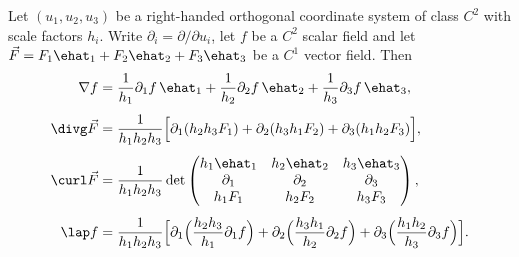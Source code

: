\begin{theorem}\label{thm:curvilinear}
Let $(u_1,u_2,u_3)$ be a right-handed orthogonal coordinate system of class $C^2$ with scale factors $h_i$. Write $\partial_i=\partial/\partial u_i$, let $f$ be a $C^2$ scalar field and let $\vec F=F_1\ehat_1+F_2\ehat_2+F_3\ehat_3$ be a $C^1$ vector field. Then
\begin{align*}
\nabla f&=\frac1{h_1}\partial_1f\,\ehat_1+\frac1{h_2}\partial_2f\,\ehat_2+\frac1{h_3}\partial_3f\,\ehat_3,\\[4pt]
\divg\vec F&=\frac1{h_1h_2h_3}\Bigl[\partial_1(h_2h_3F_1)+\partial_2(h_3h_1F_2)+\partial_3(h_1h_2F_3)\Bigr],\\[4pt]
\curl\vec F&=\frac1{h_1h_2h_3}\det\begin{pmatrix}h_1\ehat_1&h_2\ehat_2&h_3\ehat_3\\\partial_1&\partial_2&\partial_3\\h_1F_1&h_2F_2&h_3F_3\end{pmatrix},\\[4pt]
\lap f&=\frac1{h_1h_2h_3}\Bigl[\partial_1\Bigl(\frac{h_2h_3}{h_1}\partial_1f\Bigr)+\partial_2\Bigl(\frac{h_3h_1}{h_2}\partial_2f\Bigr)+\partial_3\Bigl(\frac{h_1h_2}{h_3}\partial_3f\Bigr)\Bigr].
\end{align*}
\end{theorem}


